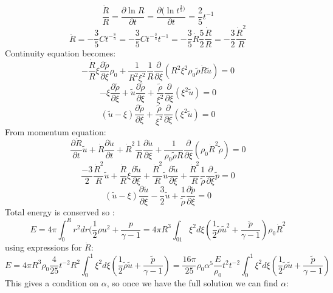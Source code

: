 \documentclass{article}
\begin{document}
        $$
        \frac{\dot R}{R} = \frac{\partial \ln R}{\partial t} = \frac{\partial (\ln t^{\frac{3}{5})}}{\partial t} = \frac{2}{5} t^{-1}
        $$
        $$
        \ddot R = - \frac{3}{5} C t^{-\frac{8}{5}} = - \frac{3}{5} C t^{-\frac{3}{5}} t^{-1} = - \frac{3}{5} \dot R \frac{5}{2} \frac{\dot R}{R} = - \frac{3}{2} \frac{\dot R^2}{R}
        $$
        Continuity equation becomes:
        $$
        - \frac{\dot R}{R} \xi \frac{\partial \tilde \rho}{\partial \xi} \rho_0 + \frac{1}{R^2 \xi^2} \frac{1}{R} \frac{\partial}{\partial \xi}(R^2 \xi^2 \rho_0 \tilde \rho \dot R \tilde u)  = 0
        $$
        $$
        - \xi \frac{\partial \tilde \rho}{\partial \xi} + \tilde u \frac{\partial \tilde \rho}{\partial \xi}+ \frac{\tilde \rho}{\xi^2} \frac{\partial}{\partial \xi}(\xi^2 \tilde u) = 0
        $$
        \begin{equation}
        (\tilde u - \xi) \frac{\partial \tilde \rho}{\partial \xi} + \frac{\tilde \rho}{\xi^2} \frac{\partial }{\partial \xi} (\xi^2 \tilde u) = 0
\end{equation}
        From momentum equation:
        $$
        \frac{\partial \dot R}{\partial t} \tilde u + \dot R \frac{\partial \tilde u}{\partial t} + \dot R^2 \frac{1}{R} \frac{\partial \tilde u}{\partial \xi} + \frac{1}{\rho_0 \tilde \rho R} \frac{\partial}{\partial \xi} (\rho_0 \dot R^2 \tilde \rho) = 0
        $$
        $$
\frac{-3}{2} \frac{\dot R^2}{R} \tilde u + \frac{\dot R}{R} \xi \frac{\partial \tilde u}{\partial \xi} + \frac{\dot R^2}{R} \tilde u \frac{\partial \tilde u}{\partial \xi} + \frac{\dot R^2}{R} \frac{1}{\tilde \rho} \frac{\partial}{\partial \xi} \tilde p =0 
        $$
        \begin{equation}
        (\tilde u - \xi) \frac{\partial \tilde u}{\partial \xi} - \frac{3}{2}\tilde u + \frac{1}{\tilde \rho} \frac{\partial \tilde p}{\partial \xi} = 0
        \end{equation}
        Total energy is conserved so :
        $$
        E= 4 \pi \int_0^R r^2 dr (\frac{1}{2} \rho u^2 + \frac{p}{\gamma -1} = 4 \pi R^3 \int_01 \xi^2 d\xi (\frac{1}{2} \tilde \rho \tilde u^2 + \frac{\tilde p}{\gamma -1}) \rho_0 \dot R^2
        $$
        using expressions for $\dot R$:
        $$
        E= 4 \pi R^3 \rho_0 \frac{4}{25} t^{-2} R^2 \int^1_0 \xi^2 d \xi (\frac{1}{2} \tilde \rho \tilde u + \frac{\tilde p}{\gamma - 1}) =  \frac{16 \pi}{25} \rho_0 \alpha^5 \frac{E}{\rho_0} t^2 t^{-2} \int^1_0 \xi^2 d \xi (\frac{1}{2} \tilde \rho \tilde u + \frac{\tilde p}{\gamma - 1}) 
        $$
        This gives a condition on $\alpha$, so once we have the full solution we can find $\alpha$:
\end{document}
